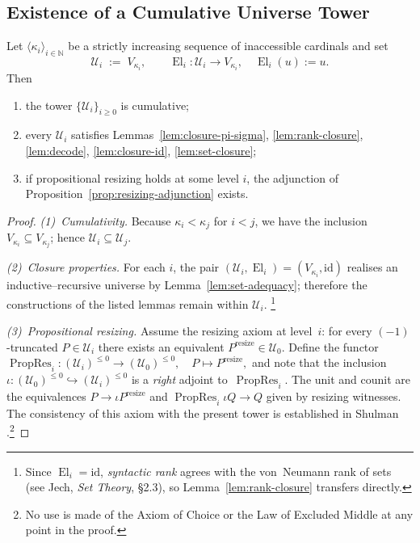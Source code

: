\documentclass[a4paper,11pt]{article}
\newcommand{\El}{\operatorname{El}}          %
\newcommand{\resize}{\mathrm{resize}}
\begin{document}
\subsection{Existence of a Cumulative Universe Tower}
\begin{theorem}
\label{thm:universe-tower-existence}
Let $\langle\kappa_{i}\rangle_{i\in\mathbb N}$ be a strictly
increasing sequence of inaccessible cardinals and set
\[
  \mathcal U_{i}\;:=\;V_{\kappa_{i}},
  \qquad
  \El_{i}\colon\mathcal U_{i}\longrightarrow V_{\kappa_{i}},
  \quad
  \El_{i}(u):=u .
\]
Then
\begin{enumerate}[(1)]
  \item the tower $\{\mathcal U_{i}\}_{i\ge0}$ is cumulative;
  \item every $\mathcal U_{i}$ satisfies
        Lemmas~\ref{lem:closure-pi-sigma},
        \ref{lem:rank-closure},
        \ref{lem:decode},
        \ref{lem:closure-id},
        \ref{lem:set-closure};
  \item if propositional resizing holds at some level $i$, the
        adjunction of
        Proposition~\ref{prop:resizing-adjunction} exists.
\end{enumerate}
\end{theorem}
\begin{proof}
\emph{(1)~Cumulativity.}
Because $\kappa_{i}<\kappa_{j}$ for $i<j$, we have the inclusion
$V_{\kappa_{i}}\subseteq V_{\kappa_{j}}$; hence
$\mathcal U_{i}\subseteq\mathcal U_{j}$.

\smallskip
\emph{(2)~Closure properties.}
For each $i$, the pair
$(\mathcal U_{i},\El_{i})=(V_{\kappa_{i}},\mathrm{id})$
realises an inductive–recursive universe
by Lemma~\ref{lem:set-adequacy}; therefore the constructions of the
listed lemmas remain within $\mathcal U_{i}$.
\footnote{%
  Since $\El_{i}=\mathrm{id}$, \emph{syntactic rank} agrees with the
  von~Neumann rank of sets (see Jech, \emph{Set Theory}, §2.3),
  so Lemma~\ref{lem:rank-closure} transfers directly.
}

\smallskip
\emph{(3)~Propositional resizing.}
Assume the resizing axiom at level~$i$:
for every $(-1)$-truncated $P\in\mathcal U_{i}$
there exists an equivalent $P^{\resize}\in\mathcal U_{0}$.
Define the functor
\(
  \operatorname{PropRes}_{i}\colon
  (\mathcal U_{i})^{\le0}\!\longrightarrow(\mathcal U_{0})^{\le0},
  \quad
  P\mapsto P^{\resize},
\)
and note that the inclusion
$\iota\colon(\mathcal U_{0})^{\le0}\hookrightarrow(\mathcal U_{i})^{\le0}$
is a \emph{right} adjoint to~$\operatorname{PropRes}_{i}$.
The unit and counit are the equivalences
$P\to\iota P^{\resize}$ and $\operatorname{PropRes}_{i}\iota Q\to Q$
given by resizing witnesses.
The consistency of this axiom with the present tower is established
in Shulman \cite[§6]{Shulman:Resizing2019}.\footnote{%
  No use is made of the Axiom of Choice or the Law of
  Excluded Middle at any point in the proof.}
\end{proof}
\end{document}
